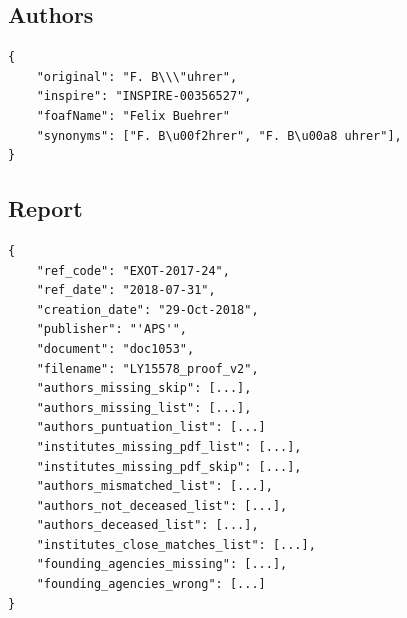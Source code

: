 \subsection{Authors}%
\label{app:proofs:author}

\begin{lstlisting}
{
    "original": "F. B\\\"uhrer",
    "inspire": "INSPIRE-00356527", 
    "foafName": "Felix Buehrer"
    "synonyms": ["F. B\u00f2hrer", "F. B\u00a8 uhrer"], 
}
\end{lstlisting}


\subsection{Report}%
\label{app:proofs:report}

\begin{lstlisting}
{
    "ref_code": "EXOT-2017-24",
    "ref_date": "2018-07-31", 
    "creation_date": "29-Oct-2018",
    "publisher": "'APS'", 
    "document": "doc1053",
    "filename": "LY15578_proof_v2", 
    "authors_missing_skip": [...], 
    "authors_missing_list": [...],
    "authors_puntuation_list": [...]
    "institutes_missing_pdf_list": [...], 
    "institutes_missing_pdf_skip": [...], 
    "authors_mismatched_list": [...], 
    "authors_not_deceased_list": [...], 
    "authors_deceased_list": [...], 
    "institutes_close_matches_list": [...], 
    "founding_agencies_missing": [...],
    "founding_agencies_wrong": [...]
}
\end{lstlisting}